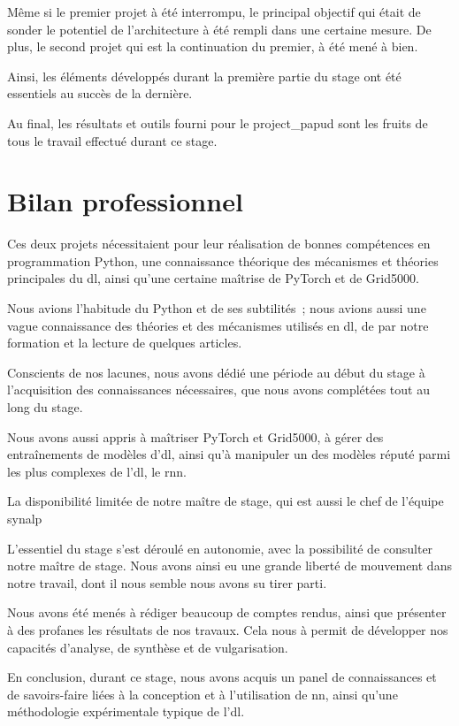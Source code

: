 Même si le premier projet à été interrompu, le principal objectif qui était de sonder le potentiel de l'architecture à été rempli dans une certaine mesure. De plus, le second projet qui est la continuation du premier, à été mené à bien.

Ainsi, les éléments développés durant la première partie du stage ont été essentiels au succès de la dernière.

Au final, les résultats et outils fourni pour le \gls{project_papud} sont les fruits de tous le travail effectué durant ce stage.

\section{Bilan professionnel}
Ces deux projets nécessitaient pour leur réalisation de bonnes compétences en programmation Python, une connaissance théorique des mécanismes et théories principales du \gls{dl}, ainsi qu'une certaine maîtrise de PyTorch et de Grid5000.

Nous avions l'habitude du Python et de ses subtilités~; nous avions aussi une vague connaissance des théories et des mécanismes utilisés en \gls{dl}, de par notre formation et la lecture de quelques articles.

Conscients de nos lacunes, nous avons dédié une période au début du stage à l'acquisition des connaissances nécessaires, que nous avons complétées tout au long du stage.

Nous avons aussi appris à maîtriser PyTorch et Grid5000, à gérer des entraînements de modèles d'\gls{dl}, ainsi qu'à  manipuler un des modèles réputé parmi les plus complexes de l'\gls{dl}, le \gls{rnn}.

La disponibilité limitée de notre maître de stage, qui est aussi le chef de l'équipe \gls{synalp}

L'essentiel du stage s'est déroulé en autonomie, avec la possibilité de consulter notre maître de stage. Nous avons ainsi eu une grande liberté de mouvement dans notre travail, dont il nous semble nous avons su tirer parti.

Nous avons été menés à rédiger beaucoup de comptes rendus, ainsi que présenter à des profanes les résultats de nos travaux. Cela nous à permit de développer nos capacités d'analyse, de synthèse et de vulgarisation.

En conclusion, durant ce stage, nous avons acquis un panel de connaissances et de savoirs-faire liées à la conception et à l'utilisation de \gls{nn}, ainsi qu'une méthodologie expérimentale typique de l'\gls{dl}.

